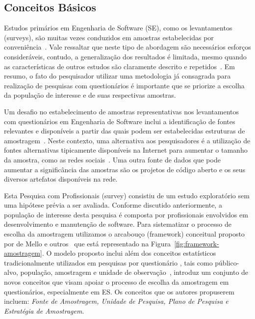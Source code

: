 \subsection{Conceitos Básicos}

Estudos primários em Engenharia de Software (SE), como os levantamentos
(surveys), são muitas vezes conduzidos em amostras estabelecidas por
conveniência~\cite{sjoberg2005survey, dybaa2006systematic}. Vale ressaltar que
neste tipo de abordagem são necessários esforços consideráveis, contudo, a
generalização dos resultados é limitada, mesmo quando as características de
outros estudos são claramente descrito e repetidos~\cite{de2015investigating}.
Em resumo, o fato do pesquisador utilizar uma metodologia já consagrada para
realização de pesquisas com questionários é importante que se priorize a escolha
da população de interesse e de suas respectivas amostras.

Um desafio no estabelecimento de amostras representativas nos levantamentos com
questionários em Engenharia de Software inclui a identificação de fontes
relevantes e disponíveis a partir das quais podem ser estabelecidas estruturas
de amostragem~\cite{de2014towards}. Neste contexto, uma alternativa aos
pesquisadores é a utilização de fontes alternativas tipicamente disponíveis na
Internet para aumentar o tamanho da amostra, como as redes
sociais~\cite{de2013would}. Uma outra fonte de dados que pode aumentar a
significância das amostras são os projetos de código aberto e os seus diversos
artefatos disponíveis na rede.

Esta Pesquisa com Profissionais (survey) consistiu de um estudo exploratório sem
uma hipótese prévia a ser avaliada. Conforme discutido anteriormente, a
população de interesse desta pesquisa é composta por profissionais envolvidos em
desenvolvimento e manutenção de software. Para sistematizar o processo de
escolha da amostragem utilizamos o arcabouço (framework) conceitual proposto por
de Mello e outros~\cite{de2014towards} que está representado na
Figura~\ref{fig:framework-amostragem}. O modelo proposto inclui além dos
conceitos estatísticos tradicionalmente utilizados em pesquisas por questionário
, tais como público-alvo, população, amostragem e unidade de
observação~\cite{thompson2012sampling}, introduz um conjunto de novos conceitos
que visam apoiar o processo de escolha da amostragem em questionários,
especialmente em ES\@. Os conceitos que os autores propuserem incluem:
\textit{Fonte de Amostragem, Unidade de Pesquisa, Plano de Pesquisa e Estratégia
	de Amostragem}.

